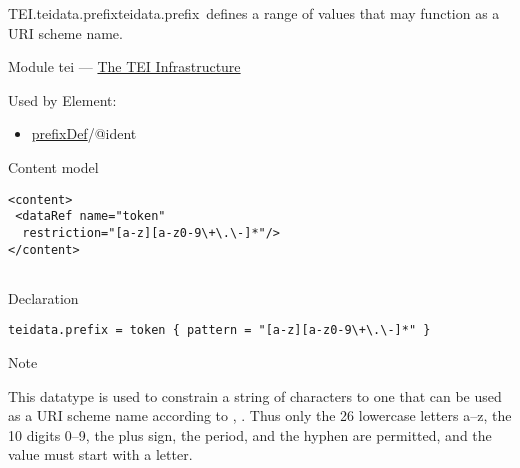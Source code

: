 \begin{reflist}
\item[]\begin{specHead}{TEI.teidata.prefix}{teidata.prefix} defines a range of values that may function as a URI scheme name.\end{specHead} 
    \item[{Module}]
  tei — \hyperref[ST]{The TEI Infrastructure}
    \item[{Used by}]
  Element: \begin{itemize}
\item \hyperref[TEI.prefixDef]{prefixDef}/@ident
\end{itemize} 
    \item[{Content model}]
  \mbox{}\hfill\\[-10pt]\begin{Verbatim}[fontsize=\small]
<content>
 <dataRef name="token"
  restriction="[a-z][a-z0-9\+\.\-]*"/>
</content>
    
\end{Verbatim}

    \item[{Declaration}]
  \mbox{}\hfill\\[-10pt]\begin{Verbatim}[fontsize=\small]
teidata.prefix = token { pattern = "[a-z][a-z0-9\+\.\-]*" }
\end{Verbatim}

    \item[{Note}]
  \par
This datatype is used to constrain a string of characters to one that can be used as a URI scheme name according to , . Thus only the 26 lowercase letters a–z, the 10 digits 0–9, the plus sign, the period, and the hyphen are permitted, and the value must start with a letter.
\end{reflist}  
